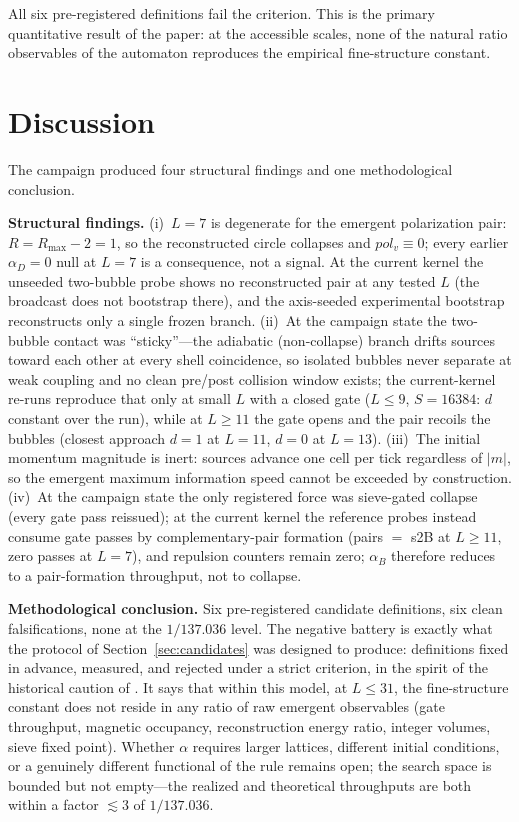 \documentclass[11pt,a4paper]{article}
\begin{document}
All six pre-registered definitions fail the criterion. This is the primary
quantitative result of the paper: at the accessible scales, none of the
natural ratio observables of the automaton reproduces the empirical
fine-structure constant.

\section{Discussion}
\label{sec:discussion}

The campaign produced four structural findings and one methodological
conclusion.

\textbf{Structural findings.} (i)~$L=7$ is degenerate for the emergent
polarization pair: $R=R_{\max}-2=1$, so the reconstructed circle collapses
and $pol_v\equiv0$; every earlier $\alpha_D=0$ null at $L=7$ is a
consequence, not a signal.  At the current kernel the unseeded two-bubble
probe shows no reconstructed pair at any tested $L$ (the broadcast does not
bootstrap there), and the axis-seeded experimental bootstrap reconstructs
only a single frozen branch. (ii)~At the campaign state the two-bubble
contact was ``sticky''---the adiabatic (non-collapse) branch drifts sources
toward each other at every shell coincidence, so isolated bubbles never
separate at weak coupling and no clean pre/post collision window exists; the
current-kernel re-runs reproduce that only at small $L$ with a closed gate
($L\le9$, $S=16384$: $d$ constant over the run), while at $L\ge11$ the gate
opens and the pair recoils the bubbles (closest approach $d=1$ at $L=11$,
$d=0$ at $L=13$). (iii)~The initial momentum magnitude is inert: sources
advance one cell per tick regardless of $|m|$, so the emergent maximum
information speed cannot be exceeded by construction. (iv)~At the campaign
state the only registered force was sieve-gated collapse (every gate pass
reissued); at the current kernel the reference probes instead consume gate
passes by complementary-pair formation (pairs $=$ s2B at $L\ge11$, zero
passes at $L=7$), and repulsion counters remain zero; $\alpha_B$ therefore
reduces to a pair-formation throughput, not to collapse.

\textbf{Methodological conclusion.} Six pre-registered candidate definitions,
six clean falsifications, none at the $1/137.036$ level. The negative battery
is exactly what the protocol of Section~\ref{sec:candidates} was designed to
produce: definitions fixed in advance, measured, and rejected under a strict
criterion, in the spirit of the historical caution of
\cite{kragh2003,good1990,feynman1985}. It says that within this model, at
$L\le31$, the fine-structure constant does not reside in any ratio of raw
emergent observables (gate throughput, magnetic occupancy, reconstruction
energy ratio, integer volumes, sieve fixed point). Whether $\alpha$ requires
larger lattices, different initial conditions, or a genuinely different
functional of the rule remains open; the search space is bounded but not
empty---the realized and theoretical throughputs are both within a factor
$\lesssim3$ of $1/137.036$.
\end{document}
